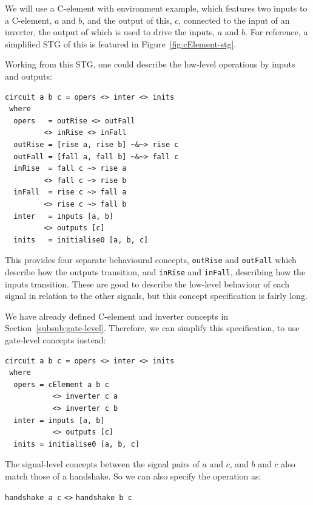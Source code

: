 \documentclass[british,conference,compsoc]{IEEEtran}
\begin{document}
We will use a C-element with environment example, which features two inputs to a C-element, $a$ and $b$, and the output
of this, $c$, connected to the input of an inverter, the output of which is used to drive the inputs, $a$ and $b$.
For reference, a simplified STG of this is featured in Figure~\ref{fig:cElement-stg}.


Working from this STG, one could describe the low-level operations by inputs and outputs:

\begin{verbatim}
circuit a b c = opers <> inter <> inits
 where
  opers   = outRise <> outFall 
         <> inRise <> inFall
  outRise = [rise a, rise b] ~&~> rise c
  outFall = [fall a, fall b] ~&~> fall c
  inRise  = fall c ~> rise a 
         <> fall c ~> rise b
  inFall  = rise c ~> fall a 
         <> rise c ~> fall b
  inter   = inputs [a, b] 
         <> outputs [c]
  inits   = initialise0 [a, b, c]
\end{verbatim}

\vspace{1mm}

\noindent This provides four separate behavioural concepts, \texttt{outRise} and \texttt{outFall}
which describe how the outputs transition, and
\texttt{inRise} and \texttt{inFall}, describing how the inputs transition. These are good
to describe the low-level behaviour of each signal in relation to the other signals, but this concept specification
is fairly long. 

We have already defined C-element and inverter concepts
in Section~\ref{subsub:gate-level}. Therefore, we can simplify this specification, 
to use gate-level concepts instead:

\begin{verbatim}
circuit a b c = opers <> inter <> inits
 where
  opers = cElement a b c 
           <> inverter c a 
           <> inverter c b
  inter = inputs [a, b] 
           <> outputs [c]
  inits = initialise0 [a, b, c]
\end{verbatim}

The signal-level concepts between the signal pairs of $a$ and $c$, and $b$ and $c$
also match those of a handshake. So we can also specify the operation as:

\vspace{-1.5mm}

\begin{center}
   \texttt{handshake a c} \texttt{<>} \texttt{handshake b c}
\end{center}
\end{document}
